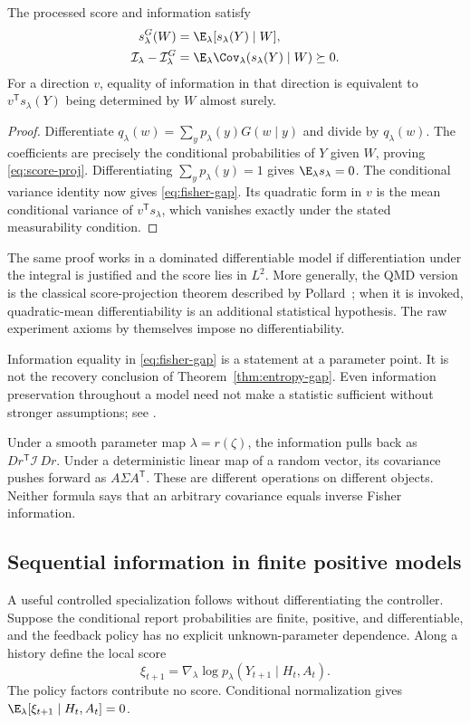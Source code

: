 \begin{theorem}\label{thm:score}
The processed score and information satisfy
\begin{align}
 s_\lambda^G(W)&=\E_\lambda[s_\lambda(Y)\mid W],\label{eq:score-proj}\\
 \mathcal I_\lambda-\mathcal I_\lambda^G
 &=\E_\lambda\Cov_\lambda(s_\lambda(Y)\mid W)\succeq0.
 \label{eq:fisher-gap}
\end{align}
For a direction $v$, equality of information in that direction is equivalent
to $v^{\mathsf T}s_\lambda(Y)$ being determined by $W$ almost surely.
\end{theorem}
\begin{proof}
Differentiate $q_\lambda(w)=\sum_y p_\lambda(y)G(w\mid y)$ and divide by
$q_\lambda(w)$. The coefficients are precisely the conditional
probabilities of $Y$ given $W$, proving \eqref{eq:score-proj}.
Differentiating $\sum_y p_\lambda(y)=1$ gives $\E_\lambda s_\lambda=0$.
The conditional variance identity now gives \eqref{eq:fisher-gap}.
Its quadratic form in $v$ is the mean conditional variance of
$v^{\mathsf T}s_\lambda$, which vanishes exactly under the stated
measurability condition.
\end{proof}

The same proof works in a dominated differentiable model if differentiation
under the integral is justified and the score lies in $L^2$. More generally,
the QMD version is the classical score-projection theorem described by
Pollard~\cite{Pollard2013}; when it is invoked, quadratic-mean
differentiability is an additional statistical hypothesis. The raw
experiment axioms by themselves impose no differentiability.

Information equality in \eqref{eq:fisher-gap} is a statement at a parameter
point. It is not the recovery conclusion of Theorem~\ref{thm:entropy-gap}.
Even information preservation throughout a model need not make a statistic
sufficient without stronger assumptions; see \cite{Pollard2013}.

Under a smooth parameter map $\lambda=r(\zeta)$, the information pulls
back as $Dr^{\mathsf T}\mathcal I\,Dr$. Under a deterministic linear
map of a random vector, its covariance pushes forward as $A\Sigma A^{\mathsf T}$.
These are different operations on different objects. Neither formula says
that an arbitrary covariance equals inverse Fisher information.

\subsection{Sequential information in finite positive models}
A useful controlled specialization follows without differentiating the
controller. Suppose the conditional report probabilities are finite,
positive, and differentiable, and the feedback policy has no explicit
unknown-parameter dependence. Along a history define the local score
\[
 \xi_{t+1}=\nabla_\lambda\log
 p_\lambda(Y_{t+1}\mid H_t,A_t).
\]
The policy factors contribute no score. Conditional normalization gives
$\E_\lambda[\xi_{t+1}\mid H_t,A_t]=0$.

